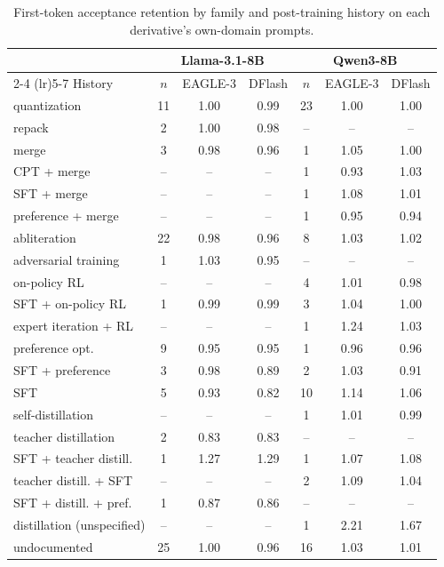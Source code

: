 \documentclass[11pt]{article}
\begin{document}
\begin{table}[h]
  \centering
  \scriptsize
  \setlength{\tabcolsep}{2.0pt}
  \begin{tabular}{@{}lcccccc@{}}
    \toprule
    & \multicolumn{3}{c}{Llama-3.1-8B} & \multicolumn{3}{c}{Qwen3-8B} \\
    \cmidrule(lr){2-4} \cmidrule(lr){5-7}
    History & $n$ & EAGLE-3 & DFlash & $n$ & EAGLE-3 & DFlash \\
    \midrule
    quantization & 11 & 1.00 & 0.99 & 23 & 1.00 & 1.00 \\
    repack & 2 & 1.00 & 0.98 & -- & -- & -- \\
    merge & 3 & 0.98 & 0.96 & 1 & 1.05 & 1.00 \\
    CPT + merge & -- & -- & -- & 1 & 0.93 & 1.03 \\
    SFT + merge & -- & -- & -- & 1 & 1.08 & 1.01 \\
    preference + merge & -- & -- & -- & 1 & 0.95 & 0.94 \\
    abliteration & 22 & 0.98 & 0.96 & 8 & 1.03 & 1.02 \\
    adversarial training & 1 & 1.03 & 0.95 & -- & -- & -- \\
    on-policy RL & -- & -- & -- & 4 & 1.01 & 0.98 \\
    SFT + on-policy RL & 1 & 0.99 & 0.99 & 3 & 1.04 & 1.00 \\
    expert iteration + RL & -- & -- & -- & 1 & 1.24 & 1.03 \\
    preference opt. & 9 & 0.95 & 0.95 & 1 & 0.96 & 0.96 \\
    SFT + preference & 3 & 0.98 & 0.89 & 2 & 1.03 & 0.91 \\
    SFT & 5 & 0.93 & 0.82 & 10 & 1.14 & 1.06 \\
    self-distillation & -- & -- & -- & 1 & 1.01 & 0.99 \\
    teacher distillation & 2 & 0.83 & 0.83 & -- & -- & -- \\
    SFT + teacher distill. & 1 & 1.27 & 1.29 & 1 & 1.07 & 1.08 \\
    teacher distill. + SFT & -- & -- & -- & 2 & 1.09 & 1.04 \\
    SFT + distill. + pref. & 1 & 0.87 & 0.86 & -- & -- & -- \\
    distillation (unspecified) & -- & -- & -- & 1 & 2.21 & 1.67 \\
    undocumented & 25 & 1.00 & 0.96 & 16 & 1.03 & 1.01 \\
    \bottomrule
  \end{tabular}
  \caption{First-token acceptance retention by family and post-training history on each derivative's own-domain prompts.}
  \label{tab:census}
\end{table}
\end{document}

